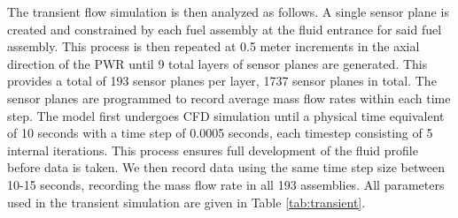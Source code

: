 \documentclass[review]{elsarticle}
\theoremstyle{definition}
\theoremstyle{definition}
\theoremstyle{remark}
\begin{document}
The transient flow simulation is then analyzed as follows. A single sensor plane is created and constrained by each fuel assembly at the fluid entrance for said fuel assembly. This process is then repeated at 0.5 meter increments in the axial direction of the PWR until 9 total layers of sensor planes are generated. This provides a total of 193 sensor planes per layer, 1737 sensor planes in total. The sensor planes are programmed to record average mass flow rates within each time step. The model first undergoes CFD simulation until a physical time equivalent of 10 seconds with a time step of 0.0005 seconds, each timestep consisting of 5 internal iterations. This process ensures full development of the fluid profile before data is taken. We then record data using the same time step size between 10-15 seconds, recording the mass flow rate in all 193 assemblies. All parameters used in the transient simulation are given in Table \ref{tab:transient}.
\end{document}
